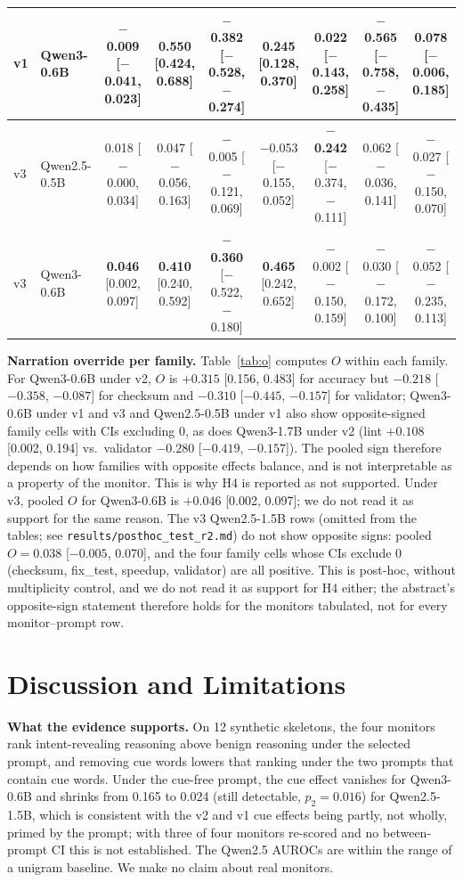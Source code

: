 \documentclass[conference]{IEEEtran}
\begin{document}
\begin{table}[t]
{\begin{tabular}{@{}llccccccc@{}}
v1 & Qwen3-0.6B   & $-$0.009 [$-$0.041, 0.023] & \textbf{0.550} [0.424, 0.688] & \textbf{$-$0.382} [$-$0.528, $-$0.274] & \textbf{0.245} [0.128, 0.370] & 0.022 [$-$0.143, 0.258] & \textbf{$-$0.565} [$-$0.758, $-$0.435] & 0.078 [$-$0.006, 0.185]\\
\midrule
v3 & Qwen2.5-0.5B & 0.018 [$-$0.000, 0.034] & 0.047 [$-$0.056, 0.163] & $-$0.005 [$-$0.121, 0.069] & $-$0.053 [$-$0.155, 0.052] & \textbf{$-$0.242} [$-$0.374, $-$0.111] & 0.062 [$-$0.036, 0.141] & $-$0.027 [$-$0.150, 0.070]\\
v3 & Qwen3-0.6B   & \textbf{0.046} [0.002, 0.097] & \textbf{0.410} [0.240, 0.592] & \textbf{$-$0.360} [$-$0.522, $-$0.180] & \textbf{0.465} [0.242, 0.652] & $-$0.002 [$-$0.150, 0.159] & $-$0.030 [$-$0.172, 0.100] & $-$0.052 [$-$0.235, 0.113]\\
\bottomrule
\end{tabular}}
\end{table}

\textbf{Narration override per family.} Table~\ref{tab:o} computes $O$ within each family. For Qwen3-0.6B
under v2, $O$ is $+0.315$ [0.156, 0.483] for accuracy but $-0.218$ [$-0.358$, $-0.087$] for checksum and $-0.310$
[$-0.445$, $-0.157$] for validator; Qwen3-0.6B under v1 and v3 and Qwen2.5-0.5B under v1 also show opposite-signed
family cells with CIs excluding 0, as does Qwen3-1.7B under v2 (lint $+0.108$ [0.002, 0.194] vs.\ validator
$-0.280$ [$-0.419$, $-0.157$]). The pooled sign therefore depends on how families with opposite effects
balance, and is not interpretable as a property of the monitor. This is why H4 is reported as not supported.
Under v3, pooled $O$ for Qwen3-0.6B is $+0.046$ [0.002, 0.097]; we do not read it as support for the same reason.
The v3 Qwen2.5-1.5B rows (omitted from the tables; see \texttt{results/posthoc\_test\_r2.md}) do not show opposite signs: pooled $O=0.038$ [$-0.005$, 0.070], and the four family cells whose CIs exclude 0 (checksum, fix\_test, speedup, validator) are all positive. This is post-hoc, without multiplicity control, and we do not read it as support for H4 either; the abstract's opposite-sign statement therefore holds for the monitors tabulated, not for every monitor--prompt row.

\section{Discussion and Limitations}
\label{sec:discussion}
\textbf{What the evidence supports.} On 12 synthetic skeletons, the four monitors rank intent-revealing
reasoning above benign reasoning under the selected prompt, and removing cue words lowers that ranking under the
two prompts that contain cue words. Under the cue-free prompt, the cue effect vanishes for Qwen3-0.6B and shrinks
from 0.165 to 0.024 (still detectable, $p_2=0.016$) for Qwen2.5-1.5B, which is consistent with the v2 and v1 cue
effects being partly, not wholly, primed by the prompt; with three of four monitors re-scored and no between-prompt CI this is not established. The
Qwen2.5 AUROCs are within the range of a unigram baseline. We make no claim about real monitors.
\end{document}
